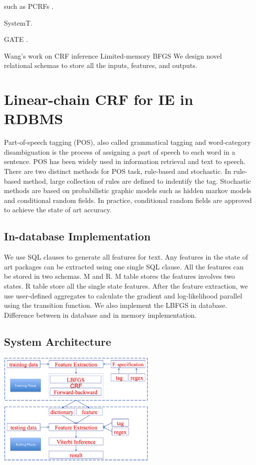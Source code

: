 \documentclass[11pt,letterpaper]{article}
\begin{document}
such as PCRFs \cite{phan2004flexcrfs}. 

SystemT\cite{chiticariu2010systemt}.

GATE \cite{Cunningham2011a}.

Wang's work on CRF inference Limited-memory BFGS We design novel relational schemas to store all the inputs, features, and outputs.

\section{Linear-chain CRF for IE in RDBMS}
Part-of-speech tagging (POS), also called grammatical tagging and word-category disambiguation is the process of assigning 
a part of speech to each word in a sentence. POS has been widely used in information retrieval and text to speech. 
There are two distinct methods for 
POS task, rule-based and stochastic.
In rule-based method, large collection of rules are defined to indentify the tag. Stochastic methods are based on 
probabilistic graphic models such as hidden markov models and conditional random fields. In practice, 
conditional random fields are approved to achieve the state of art accuracy.


\subsection{In-database Implementation}
We use SQL clauses to generate all features for text. Any features in the state of art packages can be extracted using one single SQL clause.
All the features can be stored in two schemas. M and R. M table stores the features involves two states. R table store all the single state features.
After the feature extraction, we use user-defined aggregates to calculate the gradient and log-likelihood parallel using the transition function.
We also implement the LBFGS in database. Difference between in database and in memory implementation.
  
\subsection{System Architecture}
\begin{center}
\includegraphics[height=15em]{system.png}
\end{center}
\end{document}
